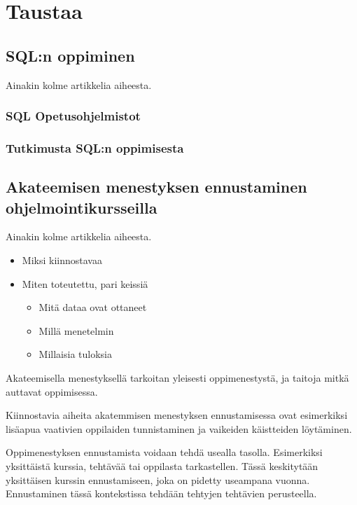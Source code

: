 \documentclass[finnish,twoside,openright]{HYgraduMLDS}
\begin{document}
\chapter{Taustaa}

\section{SQL:n oppiminen}

Ainakin kolme artikkelia aiheesta.

\subsection{SQL Opetusohjelmistot}


\subsection{Tutkimusta SQL:n oppimisesta}


\section{Akateemisen menestyksen ennustaminen ohjelmointikursseilla}

Ainakin kolme artikkelia aiheesta.

\begin{itemize}
    \item Miksi kiinnostavaa
    \item Miten toteutettu, pari keissiä
    \begin{itemize}
        \item Mitä dataa ovat ottaneet
        \item Millä menetelmin
        \item Millaisia tuloksia
    \end{itemize}
\end{itemize}

Akateemisella menestyksellä tarkoitan yleisesti oppimenestystä, ja taitoja mitkä auttavat oppimisessa.

Kiinnostavia aiheita akatemmisen menestyksen ennustamisessa ovat esimerkiksi lisäapua vaativien oppilaiden tunnistaminen ja vaikeiden käistteiden löytäminen.

Oppimenestyksen ennustamista voidaan tehdä usealla tasolla. Esimerkiksi yksittäistä kurssia, tehtävää tai oppilasta tarkastellen\cite{hellas2018predicting}. Tässä keskitytään yksittäisen kurssin ennustamiseen, joka on pidetty useampana vuonna. Ennustaminen tässä kontekstissa tehdään tehtyjen tehtävien perusteella.
\end{document}
